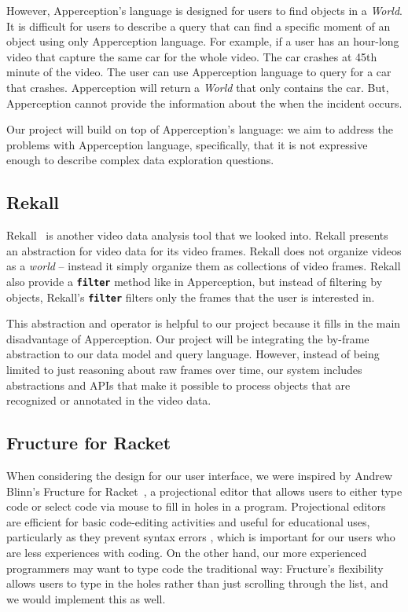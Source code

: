 However, Apperception's language is designed for users to find objects in a \emph{World}.
It is difficult for users to describe a query that can find a specific moment of an object using only Apperception language.
For example, if a user has an hour-long video that capture the same car for the whole video.
The car crashes at 45th minute of the video.
The user can use Apperception language to query for a car that crashes.
Apperception will return a \emph{World} that only contains the car.
But, Apperception cannot provide the information about the when the incident occurs.

Our project will build on top of Apperception's language: we aim to address the problems with Apperception language, specifically, that it is not expressive enough to describe complex data exploration questions.

\subsection{Rekall}
Rekall~\cite{fu:rekall} is another video data analysis tool that we looked into.
Rekall presents an abstraction for video data for its video frames.
Rekall does not organize videos as a \emph{world} --
instead it simply organize them as collections of video frames.
Rekall also provide a \textbf{\texttt{filter}} method like in Apperception, 
but instead of filtering by objects, Rekall's \textbf{\texttt{filter}} filters only the frames that the user is interested in.

This abstraction and operator is helpful to our project because it fills in the main disadvantage of Apperception.
Our project will be integrating the by-frame abstraction to our data model and query language. However, instead of being limited to just reasoning about raw frames over time, our system includes abstractions and APIs that make it possible to process objects that are recognized or annotated in the video data.


\subsection{Fructure for Racket}
When considering the design for our user interface, we were inspired by Andrew Blinn's Fructure for Racket~\cite{blinn:fructure}, a projectional editor that allows users to either type code or select code via mouse to fill in holes in a program.
Projectional editors are efficient for basic code-editing activities \cite{berger:projection} and useful for educational uses, particularly as they prevent syntax errors \cite{santos:javardise, weintrop:block-based}, which is important for our users who are less experiences with coding.
On the other hand, our more experienced programmers may want to type code the traditional way: Fructure's flexibility allows users to type in the holes rather than just scrolling through the list, and we would implement this as well.

